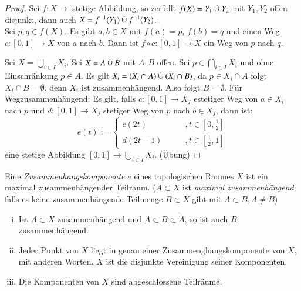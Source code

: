 \documentclass[a4paper,10pt]{scrartcl}
\begin{document}
\begin{proof}
\item Sei $ f:X\to $ stetige Abbildung, so zerfällt $f(X)=Y_1\mathbin{\dot{\cup}} Y_2$ mit $Y_1, Y_2$ offen disjunkt, dann auch $ X=f^{-1}(Y_1)\mathbin{\dot{\cup}} f^{-1}(Y_2) $. \\
\fixme[fig23]
Sei $ p,q \in f(X) $. Es gibt $ a,b\in X $ mit $ f(a)=p $, $ f(b)=q $ und einen Weg $ c:[0,1]\to X $ von $ a $ nach $ b $. Dann ist $ f\circ c:[0,1]\to X $ ein Weg von $ p $ nach $ q $.
\item Sei $ X=\bigcup_{i\in I}X_i $. Sei $ X=A\mathbin{\dot{\cup}} B $ mit $ A,B $ offen. Sei $ p\in \bigcap_{i\in I}X_i $ und ohne Einschränkung $ p\in A $.  Es gilt $ X_i=(X_i\cap A)\mathbin{\dot{\cup}} (X_i\cap B) $, da $ p\in X_i\cap A $ folgt $ X_i\cap B=\emptyset $, denn $ X_i $ ist zusammenhängend. Also folgt $ B=\emptyset $.
Für Wegzusammenhängend:
\fixme[fig24]
Es gilt, falls $ c:[0,1]\to X_I $ estetiger Weg von $ a\in X_i $ nach $ p $ und $ d:[0,1]\to X_j $ stetiger Weg von $ p $ nach $ b\in X_j $, dann ist:
\[
e(t):=\begin{cases}c(2t)\qquad &,t\in[0,\frac 1 2]\\ d(2t-1)\qquad &,t\in[\frac 1 2, 1]\end{cases}
\]
eine stetige Abbildung $ [0,1]\to \bigcup_{i\in I}X_i $. (Übung)
\end{proof}
\begin{df}
 Eine \emph{Zusammenhangskomponente} $e$ eines topologischen Raumes $X$ ist ein maximal zusammenhängender Teilraum.
($A\subset X$ ist \emph{maximal zusammenhängend}, falls es keine zusammenhängende Teilmenge $B\subset X$ gibt mit $A\subset B, A\neq B$)
\end{df}
\begin{st}\label{thm:4.4}
 \begin{enumerate}[(i)]
  \item Ist $A\subset X$ zusammenhängend und $A\subset B\subset \bar A$, so ist auch $B$ zusammenhängend.
  \item Jeder Punkt von $X$ liegt in genau einer Zusammenghangskomponente von $X$, mit anderen Worten. $X$ ist die disjunkte Vereinigung seiner Komponenten.
\item Die Komponenten von $X$ sind abgeschlossene Teilräume.
 \end{enumerate}

\end{st}
\end{document}
